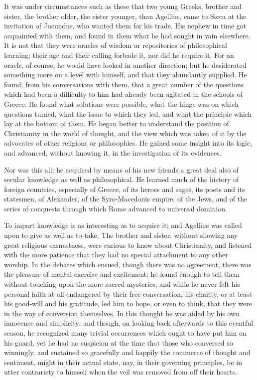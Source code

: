It was under circumstances such as these that two young Greeks,
brother and sister, the brother older, the sister younger, than
Agellius, came to Sicca at the invitation of Jucundus, who wanted them
for his trade. His nephew in time got acquainted with them, and found
in them what he had sought in vain elsewhere. It is not that they were
oracles of wisdom or repositories of philosophical learning; their age
and their calling forbade it, nor did he require it. For an oracle, of
course, he would have looked in another direction; but he desiderated
something more on a level with himself, and that they abundantly
supplied. He found, from his conversations with them, that a great
number of the questions which had been a difficulty to him had already
been agitated in the schools of Greece. He found what solutions were
possible, what the hinge was on which questions turned, what the issue
to which they led, and what the principle which lay at the bottom of
them. He began better to understand the position of Christianity in
the world of thought, and the view which was taken of it by the
advocates of other religions or philosophies. He gained some insight
into its logic, and advanced, without knowing it, in the investigation
of its evidences.

Nor was this all; he acquired by means of his new friends a great
deal also of secular knowledge as well as philosophical. He learned
much of the history of foreign countries, especially of Greece, of its
heroes and sages, its poets and its statesmen, of Alexander, of
the Syro-Macedonic empire, of the Jews, and of the series of conquests
through which Rome advanced to universal dominion.

To impart knowledge is as interesting as to acquire it; and
Agellius was called upon to give as well as to take. The brother and
sister, without showing any great religious earnestness, were curious
to know about Christianity, and listened with the more patience that
they had no special attachment to any other worship. In the debates
which ensued, though there was no agreement, there was the pleasure of
mental exercise and excitement; he found enough to tell them without
touching upon the more sacred mysteries; and while he never felt his
personal faith at all endangered by their free conversation, his
charity, or at least his good-will and his gratitude, led him to hope,
or even to think, that they were in the way of conversion themselves.
In this thought he was aided by his own innocence and simplicity; and
though, on looking back afterwards to this eventful season, he
recognized many trivial occurrences which ought to have put him on his
guard, yet he had no suspicion at the time that those who conversed so
winningly, and sustained so gracefully and happily the commerce of
thought and sentiment, might in their actual state, nay, in their
governing principles, be in utter contrariety to himself when the veil
was removed from off their hearts.

